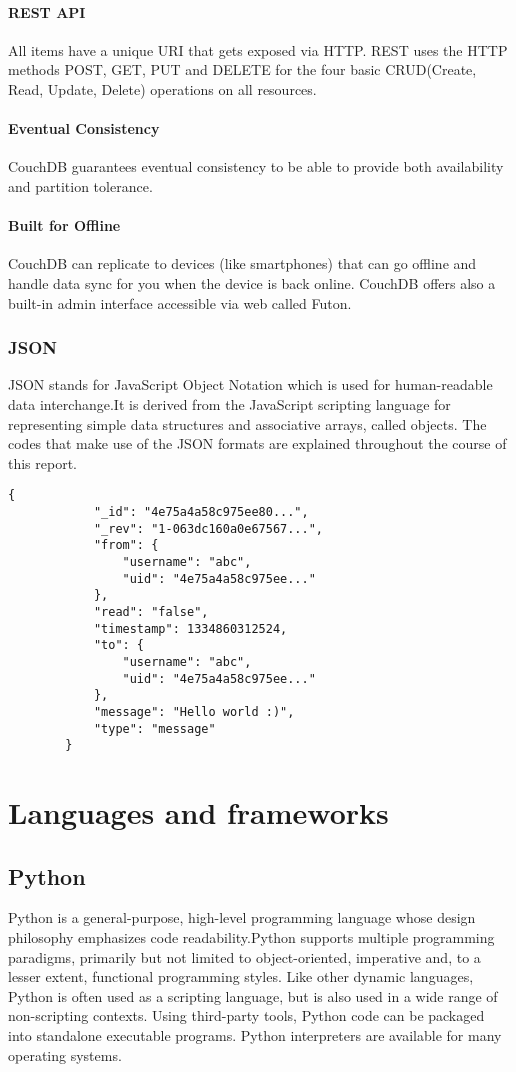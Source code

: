 \documentclass[a4paper,11pt,conference]{IEEEtran}
\begin{document}
			\paragraph{REST API}
			All items have a unique URI that gets exposed via HTTP. REST uses the HTTP methods POST, GET, PUT and DELETE for the four basic CRUD(Create, Read, Update, Delete) operations on all resources.

			\paragraph{Eventual Consistency}
			CouchDB guarantees eventual consistency to be able to provide both availability and partition tolerance.

			\paragraph{Built for Offline}
			CouchDB can replicate to devices (like smartphones) that can go offline and handle data sync for you when the device is back online. CouchDB offers also a built-in admin interface accessible via web called Futon.

		\subsubsection{JSON}

			JSON stands for JavaScript Object Notation which is used for human-readable data interchange.It is derived from the JavaScript scripting language for representing simple data structures and associative arrays, called objects. The codes that make use of the JSON formats are explained throughout the course of this report.


		\medskip
		\begin{lstlisting}[caption=Example JSON from the application DB]
		{
			"_id": "4e75a4a58c975ee80...",
			"_rev": "1-063dc160a0e67567...",
			"from": {
				"username": "abc",
				"uid": "4e75a4a58c975ee..."
			},
			"read": "false",
			"timestamp": 1334860312524,
			"to": {
				"username": "abc",
				"uid": "4e75a4a58c975ee..."
			},
			"message": "Hello world :)",
			"type": "message"
		}
		\end{lstlisting}

	\section{Languages and frameworks}

		\subsection{Python}
		Python is a general-purpose, high-level programming language whose design philosophy emphasizes code readability.Python supports multiple programming paradigms, primarily but not limited to object-oriented, imperative and, to a lesser extent, functional programming styles. Like other dynamic languages, Python is often used as a scripting language, but is also used in a wide range of non-scripting contexts. Using third-party tools, Python code can be packaged into standalone executable programs. Python interpreters are available for many operating systems.
\end{document}
